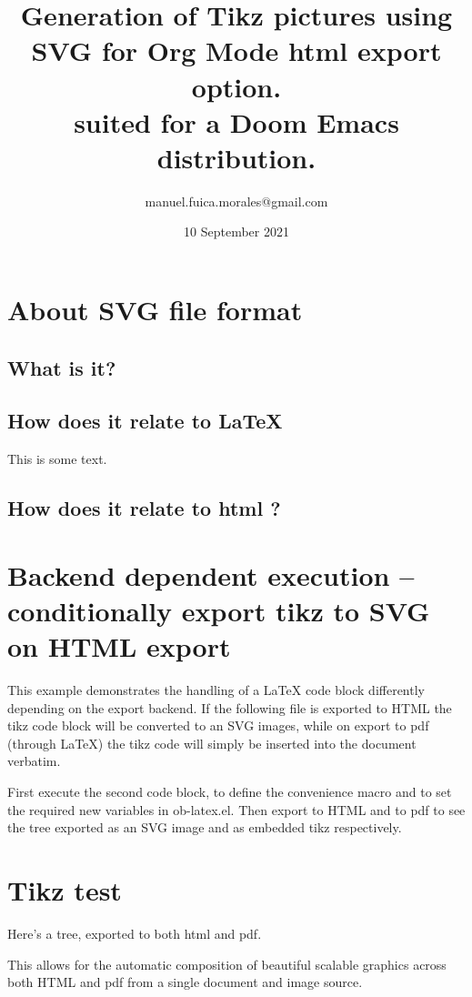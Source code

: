 \documentclass[11pt]{article}
\author{manuel.fuica.morales@gmail.com}
\date{10 September 2021}
\title{Generation of Tikz pictures using SVG for Org Mode html export option.\\\medskip
\large suited for a Doom Emacs distribution.}
\begin{document}
\maketitle
\setcounter{tocdepth}{2}
\tableofcontents


\section{About SVG file format}
\label{sec:org55c7a3c}

\subsection{What is it?}
\label{sec:org0e851df}
\subsection{How does it relate to  \LaTeX}
\label{sec:org4b42a9c}
This is some text.
\subsection{How does it relate to html ?}
\label{sec:orgf3588a3}



\section{Backend dependent execution -- conditionally export tikz to SVG on HTML export}
\label{sec:orgd3e58e2}

This example demonstrates the handling of a \LaTeX{} code block
differently depending on the export backend.  If the following file is
exported to HTML the tikz code block will be converted to an SVG
images, while on export to pdf (through \LaTeX{}) the tikz code will
simply be inserted into the document verbatim.

First execute the second code block, to define the convenience macro
and to set the required new variables in ob-latex.el.  Then export to
HTML and to pdf to see the tree exported as an SVG image and as
embedded tikz respectively.

\section{Tikz test}
\label{sec:org83b738b}
Here's a tree, exported to both html and pdf.


This allows for the automatic composition of beautiful scalable
graphics across both HTML and pdf from a single document and image
source.
\end{document}
